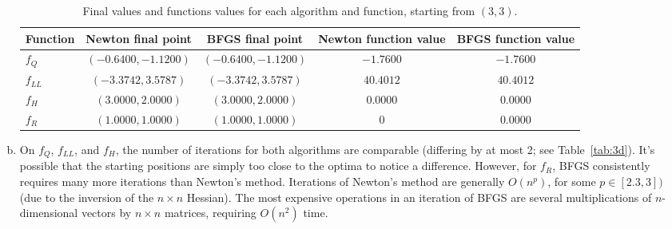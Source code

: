 \documentclass[11pt]{article}
\begin{document}
\begin{enumerate}[(a)]
\begin{table}
\centering
\begin{tabular}[h]{lcccc}
Function  & Newton final point    & BFGS final point        & Newton function value & BFGS function value   \\
\hline
$f_Q$     & $(-0.6400,  -1.1200)$ & $(-0.6400,   -1.1200)$  & $-1.7600$          & $ -1.7600$            \\
$f_{LL}$  & $(-3.3742,   3.5787)$ & $(-3.3742,    3.5787)$  & $40.4012$          & $ 40.4012$            \\
$f_H$     & $( 3.0000,   2.0000)$ & $( 3.0000,    2.0000)$  & $ 0.0000$          & $  0.0000$            \\
$f_R$     & $( 1.0000,   1.0000)$ & $( 1.0000,    1.0000)$  & $      0$          & $  0.0000$
\end{tabular}
\caption{Final values and functions values for each algorithm and
function, starting from $(3,3)$.}
\label{tab:3c3}
\end{table}

\item On $f_Q$, $f_{LL}$, and $f_H$, the number of iterations for both
algorithms are comparable (differing by at most 2; see Table~\ref{tab:3d}).
It's possible that the starting positions are simply too close to the optima to
notice a difference. However, for $f_R$, BFGS consistently requires many more
iterations than Newton's method. Iterations of Newton's method are generally
$O(n^p)$, for some $p \in [2.3,3])$ (due to the inversion of the $n \times n$
Hessian). The most expensive operations in an iteration of BFGS are several
multiplications of $n$-dimensional vectors by $n \times n$ matrices, requiring
$O(n^2)$ time.


\end{enumerate}
\end{document}
